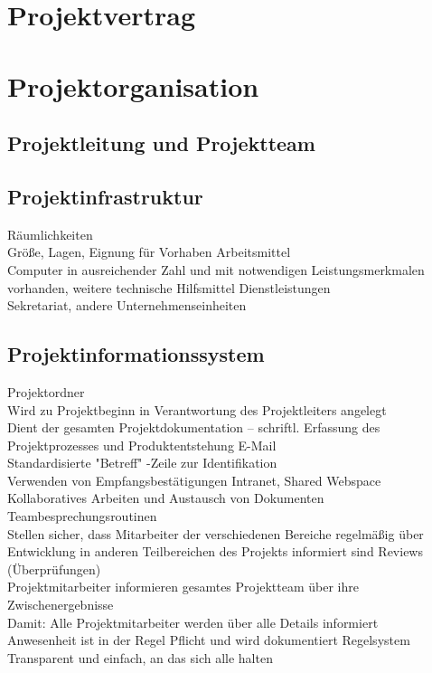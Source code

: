 \documentclass[a4paper, 12pt]{article}
\begin{document}
\section{Projektvertrag}
\section{Projektorganisation}
\subsection{Projektleitung und Projektteam}
\subsection{Projektinfrastruktur}
Räumlichkeiten
\\
Größe, Lagen, Eignung für Vorhaben 
Arbeitsmittel
\\
Computer in ausreichender Zahl und mit notwendigen 
Leistungsmerkmalen vorhanden, weitere technische Hilfsmittel
Dienstleistungen
\\
Sekretariat, andere Unternehmenseinheiten

\subsection{Projektinformationssystem}
Projektordner 
\\
Wird zu Projektbeginn in Verantwortung des Projektleiters angelegt
\\
Dient der gesamten Projektdokumentation – schriftl. Erfassung des Projektprozesses und Produktentstehung E-Mail
\\
Standardisierte "Betreff" -Zeile zur Identifikation 
\\
Verwenden von Empfangsbestätigungen Intranet, Shared Webspace 
\\
Kollaboratives Arbeiten und Austausch von Dokumenten\\
Teambesprechungsroutinen 
\\
Stellen sicher, dass Mitarbeiter der verschiedenen Bereiche regelmäßig über Entwicklung in anderen Teilbereichen des Projekts informiert sind Reviews (Überprüfungen)
\\
Projektmitarbeiter informieren gesamtes Projektteam über ihre Zwischenergebnisse 
\\
Damit: Alle Projektmitarbeiter werden über alle Details informiert
\\
Anwesenheit ist in der Regel Pflicht und wird dokumentiert Regelsystem
\\
Transparent und einfach, an das sich alle halten 
\newpage


\end{document}
